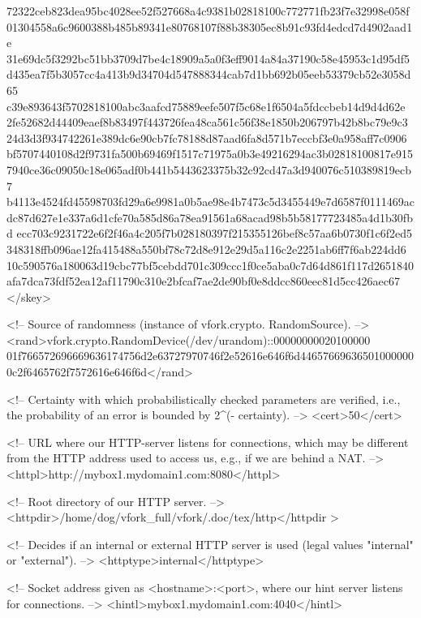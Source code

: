 72322ceb823dea95bc4028ee52f527668a4c9381b02818100c772771fb23f7e32998e058f
01304558a6c9600388b485b89341e80768107f88b38305ec8b91c93fd4edcd7d4902aad1e
31e69dc5f3292bc51bb3709d7be4c18909a5a0f3eff9014a84a37190c58e45953c1d95df5
d435ea7f5b3057cc4a413b9d34704d547888344cab7d1bb692b05eeb53379cb52e3058d65
c39e893643f5702818100abc3aafcd75889eefe507f5c68e1f6504a5fdccbeb14d9d4d62e
2fe52682d44409eaef8b83497f443726fea48ca561c56f38e1850b206797b42b8bc79e9c3
24d3d3f934742261e389dc6e90cb7fc78188d87aad6fa8d571b7eccbf3e0a958aff7c0906
bf5707440108d2f9731fa500b69469f1517c71975a0b3e49216294ac3b02818100817e915
7940ce36c09050c18e065adf0b441b5443623375b32c92cd47a3d940076c510389819ecb7
b4113e4524fd45598703fd29a6e9981a0b5ae98e4b7473c5d3455449e7d6587f0111469ac
dc87d627e1e337a6d1cfe70a585d86a78ea91561a68acad98b5b58177723485a4d1b30fbd
ecc703c9231722e6f2f46a4c205f7b028180397f215355126bef8c57aa6b0730f1c6f2ed5
348318ffb096ae12fa415488a550bf78c72d8e912e29d5a116c2e2251ab6ff7f6ab224dd6
10c590576a180063d19cbc77bf5cebdd701c309ccc1f0ce5aba0c7d64d861f117d2651840
afa7dca73fdf52ea12af11790c310e2bfcaf7ae2de90bf0e8ddcc860eec81d5cc426aec67
</skey>

   <!-- Source of randomness (instance of vfork.crypto.
        RandomSource). -->
   <rand>vfork.crypto.RandomDevice(/dev/urandom)::00000000020100000
01f766572696669636174756d2e63727970746f2e52616e646f6d44657669636501000000
0c2f6465762f7572616e646f6d</rand>

   <!-- Certainty with which probabilistically checked parameters are 
        verified, i.e., the probability of an error is bounded by 2^(-
        certainty). -->
   <cert>50</cert>

   <!-- URL where our HTTP-server listens for connections, which may 
        be different from the HTTP address used to access us, e.g., if 
        we are behind a NAT. -->
   <httpl>http://mybox1.mydomain1.com:8080</httpl>

   <!-- Root directory of our HTTP server. -->
   <httpdir>/home/dog/vfork_full/vfork/.doc/tex/http</httpdir
>

   <!-- Decides if an internal or external HTTP server is used (legal 
        values "internal" or "external"). -->
   <httptype>internal</httptype>

   <!-- Socket address given as <hostname>:<port>, where our hint 
        server listens for connections. -->
   <hintl>mybox1.mydomain1.com:4040</hintl>

